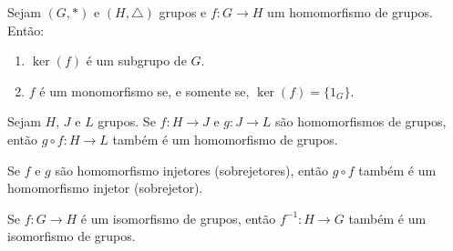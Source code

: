 \documentclass{beamer}
\begin{document}
    \begin{frame}
        \begin{proposicao}
            Sejam $(G, *)$ e $(H, \triangle)$ grupos e $f : G \to H$ um homomorfismo de grupos. Ent\~ao:
            \begin{enumerate}[label={\roman*})]
                \item $\ker(f)$ \'e um subgrupo de $G$.
                \item $f$ \'e um monomorfismo se, e somente se, $\ker(f) = \{1_G\}$.
            \end{enumerate}
        \end{proposicao}
    \end{frame}

    \begin{frame}
        \begin{proposicao}
            Sejam $H$, $J$ e $L$ grupos. Se $f : H \to J$ e $g : J \to L$ são homomorfismos de grupos, então $g \circ f : H \to L$ também é um homomorfismo de grupos.
        \end{proposicao}
    \end{frame}

    \begin{frame}
        \begin{corolario}
            Se $f$ e $g$ são homomorfismo injetores (sobrejetores), então $g \circ f$ também é um homomorfismo injetor (sobrejetor).
        \end{corolario}
    \end{frame}

    \begin{frame}
        \begin{proposicao}
            Se $f : G \to H$ é um isomorfismo de grupos, então $f^{-1} : H \to G$ também é um isomorfismo de grupos.
        \end{proposicao}
    \end{frame}
\end{document}
